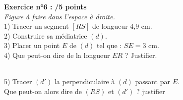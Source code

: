 \documentclass[a4paper,12pt]{article}
\begin{document}
\bigskip\textbf{Exercice n°6 :} \hspace{4 cm} \textbf{/5 points}\\
\emph{Figure à faire dans l'espace à droite.}\\
1) Tracer un segment $[RS]$ de longueur 4,9 cm.\\
2) Construire sa médiatrice $(d)$.\\
3) Placer un point $E$ de $(d)$ tel que : $SE=3$ cm.\\
4) Que peut-on dire de la longueur $ER$ ? Justifier.

\dotfill

\dotfill

\dotfill

\dotfill\\
5) Tracer $(d')$ la perpendiculaire à $(d)$ passant par $E$.\\
\phantom{5)} Que peut-on alors dire de $(RS)$ et $(d')$ ? justifier

\dotfill

\dotfill

\dotfill

\dotfill

%        
%    
\end{document}
